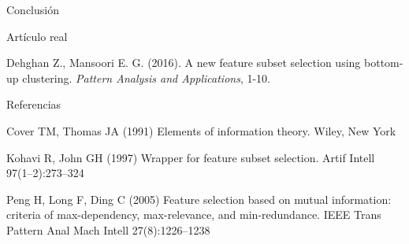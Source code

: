 \documentclass[final]{beamer}
\newlength{\onecolwid}
\begin{document}
\begin{frame}[t]
\begin{columns}[t]
\begin{column}{\onecolwid}
\begin{block}{Conclusión}
\end{block}


\begin{block}{Artículo real}

Dehghan Z., Mansoori E. G. (2016). A new feature subset selection using bottom-up clustering. \textit{Pattern Analysis and Applications}, 1-10.

\end{block}



\begin{block}{Referencias}
\nocite{*} %
\small{}
\begin{thebibliography}{}

Cover TM, Thomas JA (1991) Elements of information theory. Wiley, New York

Kohavi R, John GH (1997) Wrapper for feature subset selection. Artif Intell 97(1–2):273–324

Peng H, Long F, Ding C (2005) Feature selection based on mutual information: criteria of max-dependency, max-relevance, and min-redundance. IEEE Trans Pattern Anal Mach Intell 27(8):1226–1238

\end{thebibliography}

\end{block}




\end{column}
\end{columns}
\end{frame}
\end{document}
